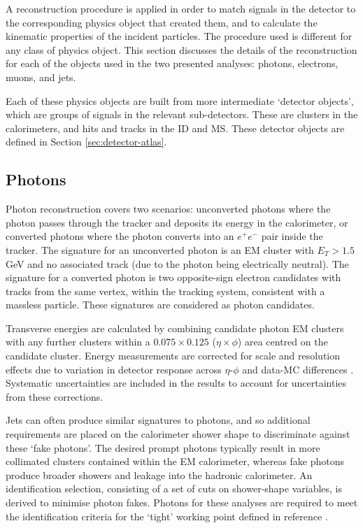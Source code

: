 
A reconstruction procedure is applied in order to match signals in the detector
to the corresponding physics object that created them, and to calculate the
kinematic properties of the incident particles.
The procedure used is different for any class of physics object. This section
discusses the details of the reconstruction for each of the objects used in the
two presented analyses: photons, electrons, muons, and jets.

Each of these physics objects are built from more intermediate `detector
objects', which are groups of signals in the relevant sub-detectors. These are
clusters in the calorimeters, and hits and tracks in the
\ac{ID} and \ac{MS}. These detector objects are defined in Section
\ref{sec:detector-atlas}.

\subsection{Photons}
\label{sec:methods-reconsruction-photon}

Photon reconstruction covers two scenarios: unconverted photons where the photon
passes through the tracker and deposits its energy in the calorimeter, or
converted photons where the photon converts into an $e^+e^-$ pair inside the
tracker.
The signature for an unconverted photon is an \ac{EM} cluster with $E_T > 1.5$
GeV and no associated
track (due to the photon being electrically neutral). The signature for a
converted photon is two opposite-sign electron candidates with tracks from the
same vertex, within the tracking system, consistent with a massless particle.
These signatures are considered as photon candidates.

Transverse energies are calculated by combining candidate photon \ac{EM}
clusters with any further clusters within a $0.075\times0.125$
($\eta\times\phi$) area centred on the candidate cluster. Energy measurements
are corrected for scale and resolution effects due to variation in detector
response across $\eta$-$\phi$ and data-\ac{MC} differences
\cite{EGamCalibration2019}. Systematic uncertainties are included in the results
to account for uncertainties from these corrections.

Jets can often produce similar signatures to photons, and so additional
requirements are placed on the calorimeter shower shape to discriminate against
these `fake photons'. The desired prompt photons typically result in more
collimated clusters contained within the \ac{EM} calorimeter, whereas fake
photons produce broader showers and leakage into the hadronic calorimeter.
An identification selection, consisting of a set of cuts on shower-shape
variables, is derived to minimise photon fakes. Photons for these analyses are
required to meet the identification criteria for the `tight' working point
defined in reference \cite{ATLASegamPerf2019}.

